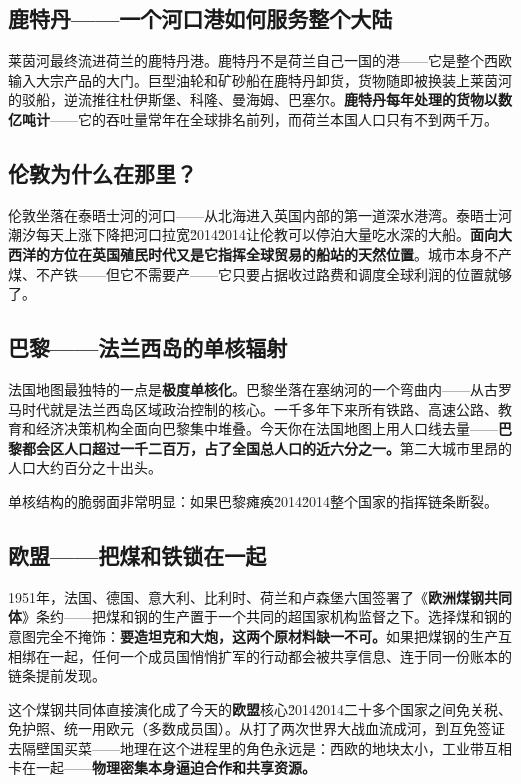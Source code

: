 \documentclass[a4paper,12pt]{ctexart}
\begin{document}
\subsection*{鹿特丹——一个河口港如何服务整个大陆}

莱茵河最终流进荷兰的鹿特丹港。鹿特丹不是荷兰自己一国的港——它是整个西欧输入大宗产品的大门。巨型油轮和矿砂船在鹿特丹卸货，货物随即被换装上莱茵河的驳船，逆流推往杜伊斯堡、科隆、曼海姆、巴塞尔。\textbf{鹿特丹每年处理的货物以数亿吨计}——它的吞吐量常年在全球排名前列，而荷兰本国人口只有不到两千万。

\subsection*{伦敦为什么在那里？}

伦敦坐落在泰晤士河的河口——从北海进入英国内部的第一道深水港湾。泰晤士河潮汐每天上涨下降把河口拉宽\u2014\u2014让伦教可以停泊大量吃水深的大船。\textbf{面向大西洋的方位在英国殖民时代又是它指挥全球贸易的船站的天然位置}。城市本身不产煤、不产铁——但它不需要产——它只要占据收过路费和调度全球利润的位置就够了。

\subsection*{巴黎——法兰西岛的单核辐射}

法国地图最独特的一点是\textbf{极度单核化}。巴黎坐落在塞纳河的一个弯曲内——从古罗马时代就是法兰西岛区域政治控制的核心。一千多年下来所有铁路、高速公路、教育和经济决策机构全面向巴黎集中堆叠。今天你在法国地图上用人口线去量——\textbf{巴黎都会区人口超过一千二百万，占了全国总人口的近六分之一。}第二大城市里昂的人口大约百分之十出头。

单核结构的脆弱面非常明显：如果巴黎瘫痪\u2014\u2014整个国家的指挥链条断裂。

\subsection*{欧盟——把煤和铁锁在一起}

1951年，法国、德国、意大利、比利时、荷兰和卢森堡六国签署了《\textbf{欧洲煤钢共同体}》条约——把煤和钢的生产置于一个共同的超国家机构监督之下。选择煤和钢的意图完全不掩饰：\textbf{要造坦克和大炮，这两个原材料缺一不可。}如果把煤钢的生产互相绑在一起，任何一个成员国悄悄扩军的行动都会被共享信息、连于同一份账本的链条提前发现。

这个煤钢共同体直接演化成了今天的\textbf{欧盟}核心\u2014\u2014\:二十多个国家之间免关税、免护照、统一用欧元（多数成员国）。从打了两次世界大战血流成河，到互免签证去隔壁国买菜——地理在这个进程里的角色永远是：西欧的地块太小，工业带互相卡在一起——\textbf{物理密集本身逼迫合作和共享资源。}
\end{document}
